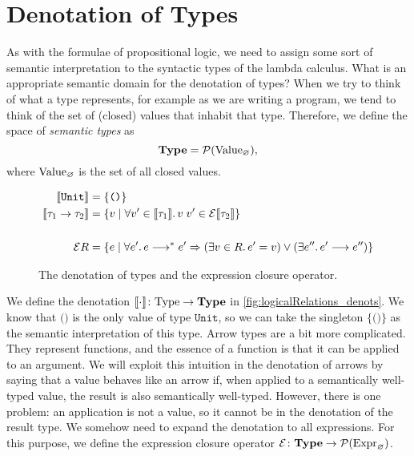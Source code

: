 \section{Denotation of Types}

As with the formulae of propositional logic, we need to assign some sort of
semantic interpretation to the syntactic types of the lambda calculus. What is
an appropriate semantic domain for the denotation of types? When we try to
think of what a type represents, for example as we are writing a program, we
tend to think of the set of (closed) values that inhabit that type. Therefore,
we define the space of \emph{semantic types} as
\[
  \textbf{Type} = \mathcal{P}(\mathrm{Value}_{\varnothing}),
\]
where $\mathrm{Value}_{\varnothing}$ is the set of all closed values.

\begin{figure}[t!!]
\begin{alignat*}{2}
  \llbracket\texttt{Unit}\rrbracket & = \{\texttt{()}\} \\
  \llbracket\tau_1 \to \tau_2\rrbracket & = \{ v \mid
    \forall v' \in \llbracket\tau_1\rrbracket\ldotp v\;v' \in \mathcal{E}\llbracket\tau_2\rrbracket \} \\\\
  \mathcal{E}R & = \{ e \mid \forall e'\ldotp e \longrightarrow^* e'
  \Rightarrow (\exists v \in R \ldotp e'=v) \lor
    (\exists e'' \ldotp e'\longrightarrow e'') \}
\end{alignat*}
\caption{The denotation of types and the expression closure operator.}
\label{fig:logicalRelations_denots}
\end{figure}

We define the denotation $\llbracket\cdot\rrbracket \colon \mathrm{Type} \to
\textbf{Type}$ in \autoref{fig:logicalRelations_denots}.
We know that $\texttt{()}$ is the only value of type $\texttt{Unit}$,
so we can take the singleton $\{\texttt{()}\}$ as the semantic
interpretation of this type.
Arrow types are a bit more complicated. They represent functions, and the
essence of a function is that it can be applied to an argument. We will exploit
this intuition in the denotation of arrows by saying that a value behaves like
an arrow if, when applied to a semantically well-typed value, the result is
also semantically well-typed. However, there is one problem: an application is
not a value, so it cannot be in the denotation of the result type.
We somehow need to expand the denotation to all expressions.
For this purpose, we define the expression closure operator
$\mathcal{E} \colon \textbf{Type} \to
  \mathcal{P}(\mathrm{Expr}_{\varnothing})$.

